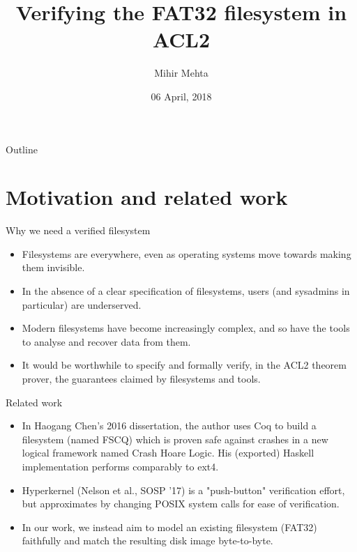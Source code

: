 \documentclass{beamer}
\title{Verifying the FAT32 filesystem in ACL2}
\author{Mihir Mehta}
\institute{
  Department of Computer Science\\
  University of Texas at Austin\\[1ex]
  \texttt{mihir@cs.utexas.edu}
}
\date{06 April, 2018}
\begin{document}
\begin{frame}[plain]
  \titlepage
\end{frame}

\begin{frame}{Outline}
  \tableofcontents
\end{frame}


\section{Motivation and related work}

\begin{frame}{Why we need a verified filesystem}
  \begin{itemize}
  \item Filesystems are everywhere, even as operating systems move
    towards making them invisible.
  \item In the absence of a clear specification of filesystems, users
    (and sysadmins in particular) are underserved.
  \item Modern filesystems have become increasingly complex, and so
    have the tools to analyse and recover data from them.
  \item It would be worthwhile to specify and formally verify, in the
    ACL2 theorem prover, the guarantees claimed by filesystems and tools.
  \end{itemize}
\end{frame}

\begin{frame}{Related work}
  \begin{itemize}
  \item In Haogang Chen's 2016 dissertation, the author uses Coq to
    build a filesystem (named FSCQ) which is proven safe against
    crashes in a new logical framework named Crash Hoare Logic. His
    (exported) Haskell implementation performs comparably to ext4.
  \item Hyperkernel (Nelson et al., SOSP '17) is a "push-button"
    verification effort, but approximates by changing POSIX system
    calls for ease of verification.
  \item In our work, we instead aim to model an existing filesystem (FAT32)
    faithfully and match the resulting disk image byte-to-byte.
  \end{itemize}
\end{frame}
\end{document}
